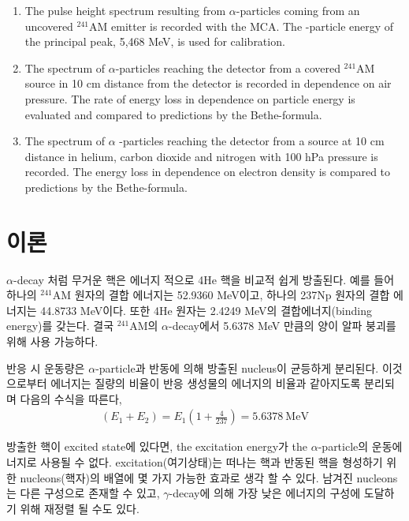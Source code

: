 \documentclass[a4paper, 10pt, nanum]{CSUniSchoolLabReport}
\begin{document}
	\begin{enumerate}[label=\arabic*.]
		\item The	pulse	height	spectrum	resulting	from	 $\alpha$-particles	coming	from	an	uncovered		 	$^{241}\textrm{AM}$ emitter	is	recorded	with	the
		MCA.	The	 -particle	energy	of	the	principal	peak,	5,468 MeV,	is	used	for	calibration.
		\item The	spectrum	of	 $\alpha$-particles	reaching	the	detector	from	a	covered	 $^{241}\textrm{AM}$	source	in	10 cm 	distance	from	the	detector	is
		recorded	in	dependence	on	air	pressure.	The	rate	of	energy	loss	in	dependence	on	particle	energy	is	evaluated	and
		compared	to	predictions	by	the	Bethe-formula.
		\item The	spectrum	of	$\alpha$ -particles	reaching	the	detector	from	a	source	at	10 cm 	distance	in	helium,	carbon	dioxide	and	nitrogen
		with	100 hPa 	pressure	is	recorded.	The	energy	loss	in	dependence	on	electron	density	is	compared	to	predictions	by	the
		Bethe-formula.
	\end{enumerate}


\section{이론}

	$\alpha$-decay 처럼 무거운 핵은 에너지 적으로 4He 핵을 비교적 쉽게 방출된다. 예를 들어 하나의 $^{241}\textrm{AM}$ 원자의 결합 에너지는 52.9360 MeV이고, 하나의 237Np 원자의 결합 에너지는 44.8733 MeV이다. 또한 4He 원자는 2.4249 MeV의 결합에너지(binding energy)를 갖는다. 결국 $^{241}\textrm{AM}$의 $\alpha$-decay에서 5.6378 MeV 만큼의 양이 알파 붕괴를 위해 사용 가능하다.

	반응 시 운동량은 $\alpha$-particle과 반동에 의해 방출된 nucleus이 균등하게 분리된다. 이것으로부터 에너지는 질량의 비율이 반응 생성물의 에너지의 비율과 같아지도록 분리되며 다음의 수식을 따른다,
	\begin{align*}
		(E_1 + E_2) = E_1 \left( 1 + \frac{4}{237} \right) = 5.6378 ~\textrm{MeV}
	\end{align*}

	방출한 핵이 excited state에 있다면, the excitation energy가 the $\alpha$-particle의 운동에너지로 사용될 수 없다. excitation(여기상태)는 떠나는 핵과 반동된 핵을 형성하기 위한 nucleons(핵자)의 배열에 몇 가지 가능한 효과로 생각 할 수 있다. 남겨진 nucleons는 다른 구성으로 존재할 수 있고, $\gamma$-decay에 의해 가장 낮은 에너지의 구성에 도달하기 위해 재정렬 될 수도 있다. 
\end{document}

